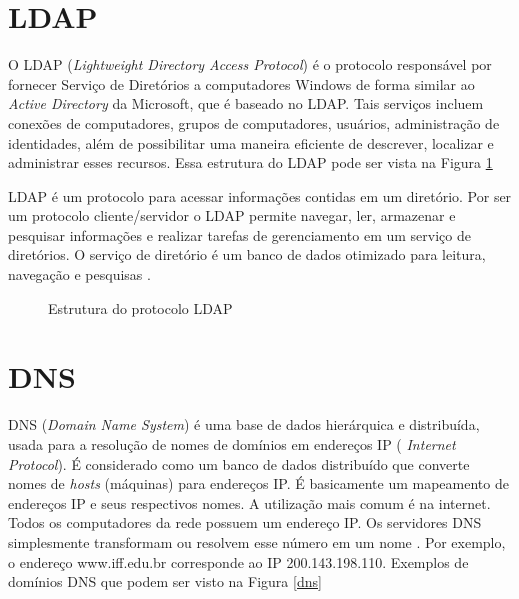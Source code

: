 \section{LDAP}

O LDAP (\textit{Lightweight Directory Access Protocol}) é o protocolo responsável por fornecer Serviço de Diretórios a computadores Windows de forma similar ao \textit{Active Directory} da Microsoft, que é baseado no LDAP. Tais serviços incluem conexões de computadores, grupos de computadores, usuários, administração de identidades, além de possibilitar uma maneira eficiente de descrever, localizar e administrar esses recursos. Essa estrutura do LDAP pode ser vista na Figura \ref{ldap}

LDAP é um protocolo para acessar informações contidas em um diretório. Por ser um protocolo cliente/servidor o LDAP permite navegar, ler, armazenar e pesquisar informações e realizar tarefas de gerenciamento em um serviço de diretórios. O serviço de diretório é um banco de dados otimizado para leitura, navegação e pesquisas \cite{TRIGO}.

\pagebreak

\begin{figure}[ht]
   	\centering
   	\caption{Estrutura do protocolo LDAP \cite{LDAP}}
    \label{ldap}
\end{figure}

\section{DNS}

DNS (\textit{Domain Name System}) é uma base de dados hierárquica e distribuída, usada para a resolução de nomes de domínios em endereços IP (\textit{ Internet Protocol}). É considerado como um banco de dados distribuído que converte nomes de \textit{hosts} (máquinas) para endereços IP. É basicamente um mapeamento de endereços IP e seus respectivos nomes. A utilização mais comum é na internet. Todos os computadores da rede possuem um endereço IP. Os servidores DNS simplesmente transformam ou resolvem esse número em um nome \cite{SCRIMER}. Por exemplo, o endereço www.iff.edu.br corresponde ao IP 200.143.198.110. Exemplos de domínios DNS que podem ser visto na Figura \ref{dns}

